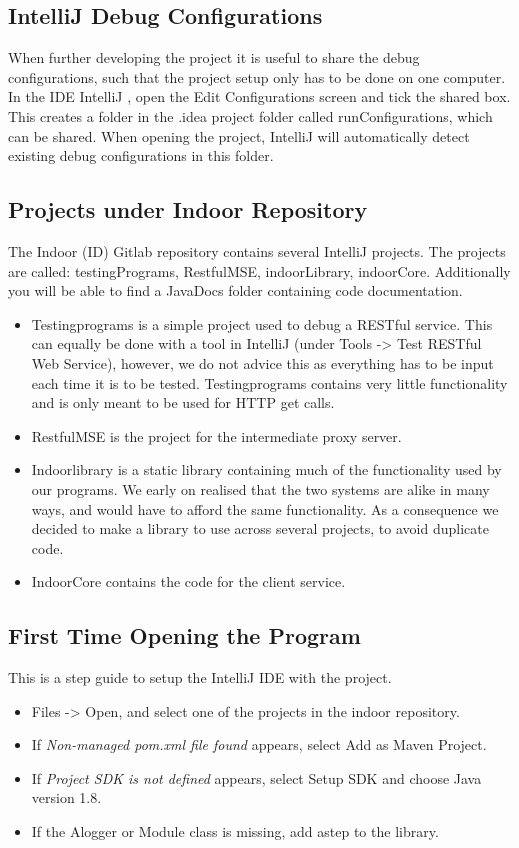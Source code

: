 \subsection*{IntelliJ Debug Configurations}
When further developing the project it is useful to share the debug configurations, such that the project setup only has to be done on one computer. In the IDE IntelliJ \cite{intellij}, open the Edit Configurations screen and tick the shared box. This creates a folder in the .idea project folder called runConfigurations, which can be shared. When opening the project, IntelliJ will automatically detect existing debug configurations in this folder.

\subsection*{Projects under Indoor Repository}
The Indoor (ID) Gitlab repository contains several IntelliJ projects. The projects are called: testingPrograms, RestfulMSE, indoorLibrary, indoorCore. Additionally you will be able to find a JavaDocs folder containing code documentation.

\begin{itemize}
\item Testingprograms is a simple project used to debug a RESTful service. This can equally be done with a tool in IntelliJ (under Tools -> Test RESTful Web Service), however, we do not advice this as everything has to be input each time it is to be tested. Testingprograms contains very little functionality and is only meant to be used for HTTP get calls.
\item RestfulMSE is the project for the intermediate proxy server. 
\item Indoorlibrary is a static library containing much of the functionality used by our programs. We early on realised that the two systems are alike in many ways, and would have to afford the same functionality. As a consequence we decided to make a library to use across several projects, to avoid duplicate code. 
\item IndoorCore contains the code for the client service. 
\end{itemize} 

\subsection*{First Time Opening the Program}
This is a step guide to setup the IntelliJ IDE with the project.
\begin{itemize}
\item Files -> Open, and select one of the projects in the indoor repository.
\item If \emph{Non-managed pom.xml file found} appears, select Add as Maven Project.
\item If \emph{Project SDK is not defined} appears, select Setup SDK and choose Java version 1.8.
\item If the Alogger or Module class is missing, add astep to the library.
\end{itemize}
